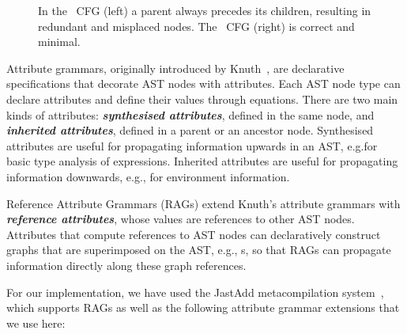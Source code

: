 \begin{center}
\begin{figure}
\scalebox{1}{
  
 }
\caption{In the \ParentFirst\  CFG (left) a parent always precedes its children,
resulting in redundant and misplaced nodes.
The \ASTUnrestricted\ CFG (right) is correct and minimal.}
  \label{fig:semanticsvssyntax}
\end{figure}
\end{center}
%
Attribute grammars, originally introduced by Knuth~\cite{knuth1968semantics}, 
are declarative specifications that decorate AST nodes with attributes.
Each AST node type can declare attributes and define their values through equations.
There are two main kinds of attributes: \textbf{\emph{synthesised attributes}}, 
defined in the same node, and \textbf{\emph{inherited attributes}}, defined in
a parent or an ancestor node.
Synthesised attributes are useful for propagating information upwards in an AST,
e.g.\@ for basic type analysis of expressions.
Inherited attributes are useful for propagating information downwards,
e.g., for environment information.

Reference Attribute Grammars (RAGs) \cite{hedin2000rags} extend Knuth's
attribute grammars with \textbf{\emph{reference attributes}}, whose values are references to other AST nodes.
Attributes that compute references to AST nodes can declaratively construct graphs that are superimposed on the AST, e.g., {\CFG}s, so that RAGs can propagate information directly along these graph references.

For our implementation, we have used the JastAdd metacompilation system~\cite{hedin2003jastadd}, which supports RAGs as well as the following attribute grammar extensions that we use here:

